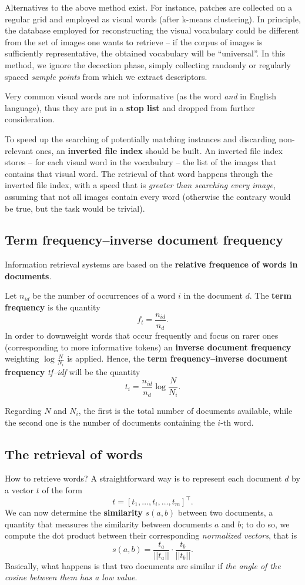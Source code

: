 \documentclass[10pt]{report}
\begin{document}
Alternatives to the above method exist. For instance, patches are collected on a regular grid and employed as visual words (after k\--means clustering). In principle, the database employed for reconstructing the visual vocabulary could be different from the set of images one wants to retrieve -- if the corpus of images is sufficiently representative, the obtained vocabulary will be ``universal''. In this method, we ignore the decection phase, simply collecting randomly or regularly spaced \emph{sample points} from which we extract descriptors.

Very common visual words are not informative (as the word \emph{and} in English language), thus they are put in a \textbf{stop list} and dropped from further consideration.

To speed up the searching of potentially matching instances and discarding non\--relevant ones, an \textbf{inverted file index} should be built. An inverted file index stores -- for each visual word in the vocabulary -- the list of the images that contains that visual word. The retrieval of that word happens through the inverted file index, with a speed that is \emph{greater than searching every image}, assuming that not all images contain every word (otherwise the contrary would be true, but the task would be trivial).

\subsection{Term frequency\---inverse document frequency}
\label{sec:orga3c8334}
Information retrieval systems are based on the \textbf{relative frequence of words in documents}.

Let \(n_{id}\) be the number of occurrences of a word \(i\) in the document \(d\). The \textbf{term frequency} is the quantity $$f_t = \frac{n_{id}}{n_d}.$$ In order to downweight words that occur frequently and focus on rarer ones (corresponding to more informative tokens) an \textbf{inverse document frequency} weighting \(\log{\frac{N}{N_i}}\) is applied. Hence, the \textbf{term frequency\---inverse document frequency} \emph{tf--idf} will be the quantity $$t_i = \frac{n_{id}}{n_d}\log{\frac{N}{N_i}}.$$

Regarding \(N\) and \(N_i\), the first is the total number of documents available,
while the second one is the number of documents containing the \(i\mbox{-th}\)
word.

\subsection{The retrieval of words}
\label{sec:org1937e2a}
How to retrieve words? A straightforward way is to represent each document \(d\) by a vector \(t\) of the form $$t = [t_1, \dots, t_i, \dots, t_m]^\top.$$ We can now determine the \textbf{similarity} \(s(a,b)\) between two documents, a quantity that measures the similarity between documents \(a\) and \(b\); to do so, we compute the dot product between their corresponding \emph{normalized vectors}, that is $$s(a,b) = \frac{t_a}{||t_a||}\cdot\frac{t_b}{||t_b||}.$$ Basically, what happens is that two documents are similar if \emph{the angle of the cosine between them has a low value}.
\end{document}
